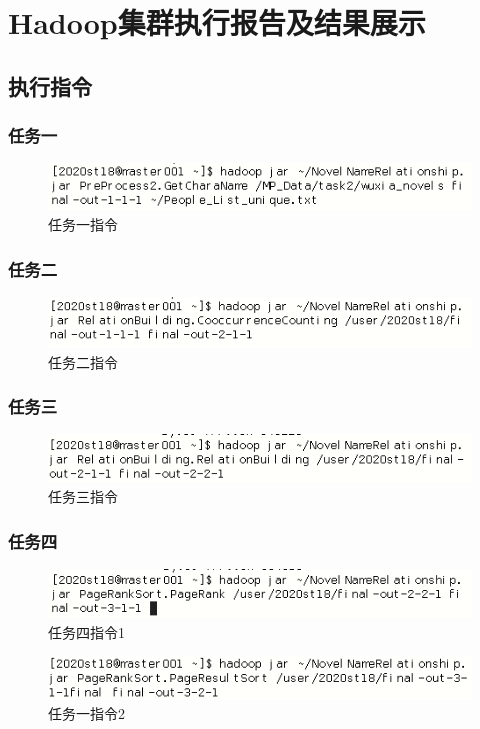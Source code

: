 \documentclass[a4paper,UTF8]{article}
\numberwithin{equation}{section}
\begin{document}
\section{Hadoop集群执行报告及结果展示}
\subsection{执行指令}
\subsubsection{任务一}
\begin{figure}[H]
    \centering
    \includegraphics[width = 15cm]{task1-1-input.png}
    \caption{任务一指令}
\end{figure}

\subsubsection{任务二}
\begin{figure}[H]
    \centering
    \includegraphics[width = 15cm]{task2-1-input.png}
    \caption{任务二指令}
\end{figure}

\subsubsection{任务三}
\begin{figure}[H]
    \centering
    \includegraphics[width = 15cm]{task3-1-input.png}
    \caption{任务三指令}
\end{figure}

\subsubsection{任务四}
\begin{figure}[H]
    \centering
    \includegraphics[width = 15cm]{task4-1-input.png}
    \caption{任务四指令1}
\end{figure}
\begin{figure}[H]
    \centering
    \includegraphics[width = 15cm]{task4-2-input.png}
    \caption{任务一指令2}
\end{figure}
\end{document}
